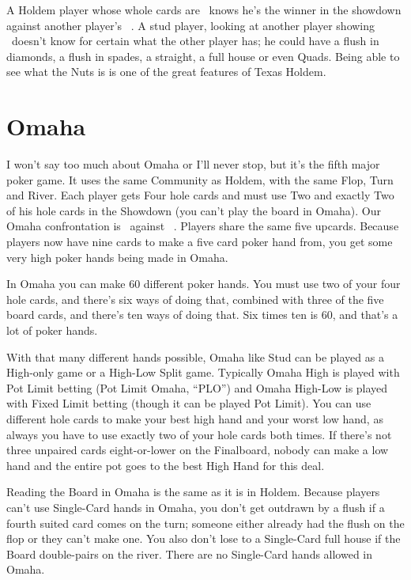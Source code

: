 A Holdem player whose whole cards are \Ad\tred\ knows he's the winner
in the showdown against another player's
\back\back\nines\Qd\Jd\tres\fourd\ . A stud player, looking at another
player showing \back\back\nines\Qd\Jd\tres\back\ doesn't know for
certain what the other player has; he could have a flush in diamonds,
a flush in spades, a straight, a full house or even Quads. Being able
to see what the Nuts is is one of the great features of Texas Holdem.

\section{Omaha}

I won't say too much about Omaha or I'll never stop, but it's the
fifth major poker game. It uses the same Community as
Holdem, with the same Flop, Turn and River. Each player gets Four hole
cards and must use Two and exactly Two of his hole cards in the
Showdown (you can't play the board in Omaha). Our Omaha confrontation
is 
\back\back\back\back\nines\Qd\Jd\tres\fourd\ against
\back\back\back\back\nines\Qd\Jd\tres\fourd\ . Players share the same five
upcards. Because players now have nine cards to make a five card poker
hand from, you get some very high poker hands being made in Omaha.

In Omaha you can make 60 different poker hands. You must use two of
your four hole cards, and there's six ways of doing that, combined
with three of the five board cards, and there's ten ways of doing
that. Six times ten is 60, and that's a lot of poker hands.

With that many different hands possible, Omaha like Stud can be played
as a High-only game or a High-Low Split game. Typically Omaha High is
played with Pot Limit betting (Pot Limit Omaha, ``PLO'') and Omaha
High-Low is played with Fixed Limit betting (though it can be played
Pot Limit). You can use different hole cards to make your best high
hand and your worst low hand, as always you have to use exactly two of
your hole cards both times. If there's not three unpaired cards
eight-or-lower on the Finalboard, nobody can make a low hand and the
entire pot goes to the best High Hand for this deal.

Reading the Board in Omaha is the same as it is in Holdem. Because
players can't use Single-Card hands in Omaha, you don't get outdrawn
by a flush if a fourth suited card comes on the turn; someone either
already had the flush on the flop or they can't make one. You also
don't lose to a Single-Card full house if the Board double-pairs on
the river. There are no Single-Card hands allowed in Omaha.

